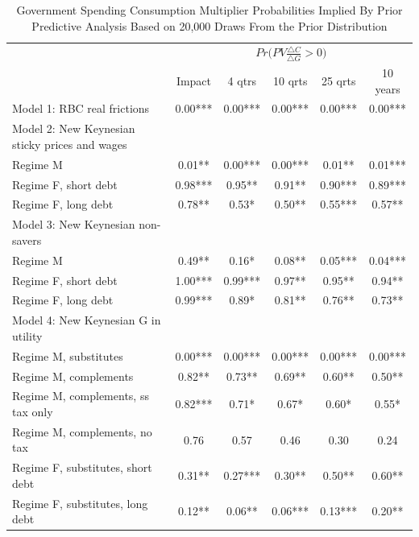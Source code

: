 \documentclass[letterpaper,12pt]{article}%
\begin{document}
\begin{table}[H]
    \centering
    \begin{threeparttable}
     \caption{Government Spending Consumption Multiplier Probabilities Implied By Prior Predictive Analysis Based on 20,000 Draws From the Prior Distribution}
    \begin{tabular}{l c c c c c}
    \toprule
        & \multicolumn{5}{c}{$Pr\Big(PV \frac{\triangle C}{\triangle G}>0\Big)$}\\
        \cmidrule{2-6}
        & Impact & 4 qtrs & 10 qrts & 25 qrts & 10 years \\
        \midrule
     Model 1: RBC real frictions &  0.00***   & 0.00***  & 0.00***  & 0.00***  & 0.00*** \\
     Model 2: New Keynesian sticky prices and wages    &    &   &   &   &  \\
     \quad Regime M &   0.01** &  0.00***  & 0.00*** & 0.01** & 0.01***  \\
     \quad Regime F, short debt &  0.98*** & 0.95** &  0.91**  & 0.90***  & 0.89***  \\
     \quad Regime F, long debt &  0.78**  &  0.53* & 0.50** & 0.55*** & 0.57**  \\
     Model 3: New Keynesian non-savers &    &   &   &   &  \\
     \quad Regime M &  0.49** &  0.16* & 0.08** & 0.05*** & 0.04*** \\
     \quad Regime F, short debt &  1.00*** & 0.99***  & 0.97** &  0.95** &  0.94** \\
     \quad Regime F, long debt &  0.99*** &  0.89*  & 0.81** & 0.76**  & 0.73**  \\
     Model 4: New Keynesian G in utility &    &   &   &   &  \\
     \quad Regime M, substitutes &  0.00*** &  0.00*** & 0.00*** & 0.00*** & 0.00***  \\
     \quad Regime M, complements &   0.82**  & 0.73**  & 0.69** & 0.60**  & 0.50** \\
     \quad Regime M, complements, ss tax only & 0.82*** & 0.71* &  0.67* & 0.60* & 0.55*  \\
     \quad Regime M, complements, no tax &  0.76  & 0.57  & 0.46 & 0.30  & 0.24  \\
     \quad Regime F, substitutes, short debt & 0.31** & 0.27***  & 0.30**  & 0.50** & 0.60**  \\
     \quad Regime F, substitutes, long debt &   0.12** & 0.06**  & 0.06*** & 0.13***  & 0.20**  \\

\end{tabular}
\end{threeparttable}
\end{table}
\end{document}
